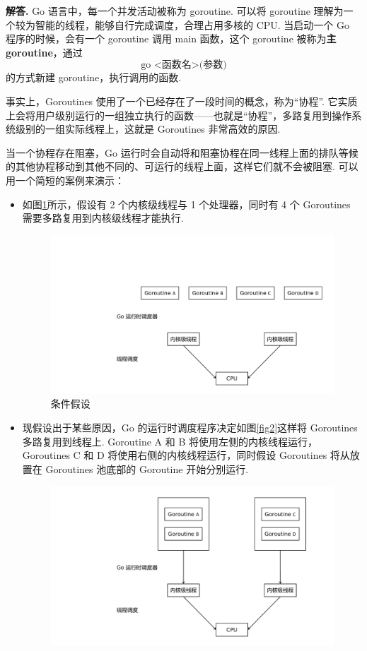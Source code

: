 \documentclass[12pt, a4paper, oneside]{ctexart}
\newenvironment{solution}{\par\noindent\textbf{解答. }}{\par}
\begin{document}
\begin{solution}
    Go 语言中，每一个并发活动被称为 goroutine.
    可以将 goroutine 理解为一个较为智能的线程，能够自行完成调度，合理占用多核的 CPU.
    当启动一个 Go 程序的时候，会有一个 goroutine 调用 main 函数，这个 goroutine 被称为\textbf{主 goroutine}，通过
    $$\text{go <函数名>(参数)}$$
    的方式新建 goroutine，执行调用的函数.

    事实上，Goroutines 使用了一个已经存在了一段时间的概念，称为“协程”.
    它实质上会将用户级别运行的一组独立执行的函数——也就是“协程”，多路复用到操作系统级别的一组实际线程上，这就是 Goroutines 非常高效的原因.

    当一个协程存在阻塞，Go 运行时会自动将和阻塞协程在同一线程上面的排队等候的其他协程移动到其他不同的、可运行的线程上面，这样它们就不会被阻塞.
    可以用一个简短的案例来演示：
    \begin{itemize}
        \item 如图\ref{fig1}所示，假设有 2 个内核级线程与 1 个处理器，同时有 4 个 Goroutines 需要多路复用到内核级线程才能执行.
            \begin{figure}[!htbp]
                \centering
                \includegraphics[width=13cm]{images/fig1.pdf}
                \caption{条件假设}
                \label{fig1}
            \end{figure}
        \item 现假设出于某些原因，Go 的运行时调度程序决定如图\ref{fig2}这样将 Goroutines 多路复用到线程上. Goroutine A 和 B 将使用左侧的内核线程运行，Goroutines C 和 D 将使用右侧的内核线程运行，同时假设 Goroutines 将从放置在 Goroutines 池底部的 Goroutine 开始分别运行.
            \begin{figure}[!htbp]
                \centering
                \includegraphics[width=13cm]{images/fig2.pdf}

\end{figure}
\end{itemize}
\end{solution}
\end{document}
